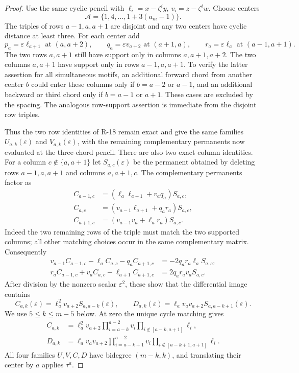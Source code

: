 \documentclass[11pt,a4paper]{article}
\theoremstyle{definition}\newtheorem{definition}{Definition}
\begin{document}
\begin{proof}
Use the same cyclic pencil with
$\ell_i=x-\zeta^iy$, $v_i=z-\zeta^iw$.
Choose centers
\[
 \mathcal A=\{1,4,\ldots,1+3(a_m-1)\}.
\]
The triples of rows $a-1,a,a+1$ are disjoint and any two
centers have cyclic distance at least three.
For each center add
\begin{equation}\label{R19:threechords}
 p_a=\varepsilon\ell_{a+1}\text{ at }(a,a+2),\qquad
 q_a=\varepsilon v_{a+2}\text{ at }(a+1,a),\qquad
 r_a=\varepsilon\ell_a\text{ at }(a-1,a+1).
\end{equation}
The two rows $a,a+1$ still have support only in columns
$a,a+1,a+2$. The two columns $a,a+1$ have support only
in rows $a-1,a,a+1$. To verify the latter assertion for
all simultaneous motifs, an additional forward chord
from another center $b$ could enter these columns only
if $b=a-2$ or $a-1$, and an additional backward or third
chord only if $b=a-1$ or $a+1$. These cases are excluded
by the spacing. The analogous row-support assertion is
immediate from the disjoint row triples.

Thus the two row identities of R-18 remain exact and
give the same families $U_{a,k}(\varepsilon)$ and
$V_{a,k}(\varepsilon)$, with the remaining complementary
permanents now evaluated at the three-chord pencil.
There are also two exact column identities. For a column
$c\notin\{a,a+1\}$ let $S_{a,c}(\varepsilon)$ be the
permanent obtained by deleting rows $a-1,a,a+1$ and
columns $a,a+1,c$. The complementary permanents factor as
\[
 \begin{aligned}
 C_{a-1,c}&=(\ell_a\ell_{a+1}+v_aq_a)S_{a,c},\\
 C_{a,c}&=(v_{a-1}\ell_{a+1}+q_ar_a)S_{a,c},\\
 C_{a+1,c}&=(v_{a-1}v_a+\ell_ar_a)S_{a,c}.
 \end{aligned}
\]
Indeed the two remaining rows of the triple must match
the two supported columns; all other matching choices
occur in the same complementary matrix.
Consequently
\begin{align*}
 v_{a-1}C_{a-1,c}-\ell_a C_{a,c}-q_a C_{a+1,c}
    &=-2q_ar_a\ell_a S_{a,c},\\
 r_a C_{a-1,c}+v_a C_{a,c}-\ell_{a+1}C_{a+1,c}
    &= 2q_ar_av_a S_{a,c}.
\end{align*}
After division by the nonzero scalar $\varepsilon^2$,
these show that the differential image contains
\[
 C_{a,k}(\varepsilon)=\ell_a^2v_{a+2}S_{a,a-k}(\varepsilon),
 \qquad
 D_{a,k}(\varepsilon)=\ell_av_av_{a+2}S_{a,a-k+1}(\varepsilon).
\]
We use $5\leq k\leq m-5$ below.
At zero the unique cycle matching gives
\[
 \begin{aligned}
 C_{a,k}&=\ell_a^2v_{a+2}
       \prod_{i=a-k}^{a-2}v_i
       \prod_{i\notin[a-k,a+1]}\ell_i,\\
 D_{a,k}&=\ell_av_av_{a+2}
       \prod_{i=a-k+1}^{a-2}v_i
       \prod_{i\notin[a-k+1,a+1]}\ell_i.
 \end{aligned}
\]
All four families $U,V,C,D$ have bidegree $(m-k,k)$,
and translating their center by $a$ applies $\tau^a$.


\end{proof}
\end{document}
